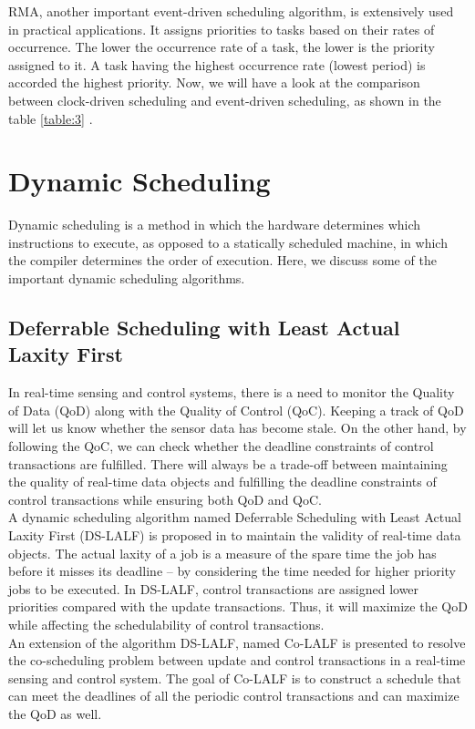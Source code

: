 \documentclass[12pt]{report}
\begin{document}
RMA, another important event-driven scheduling algorithm, is extensively used in practical applications. It assigns priorities to tasks based on their rates of occurrence. The lower the occurrence rate of a task, the lower is the priority assigned to it. A task having the highest occurrence rate (lowest period) is accorded the highest priority. Now, we will have a look at the comparison between clock-driven scheduling and event-driven scheduling, as shown in the table \ref{table:3} \cite{diff-clock-event}. 

\section{Dynamic Scheduling}
Dynamic scheduling is a method in which the hardware determines which instructions to execute, as opposed to a statically scheduled machine, in which the compiler determines the order of execution. Here, we discuss some of the important dynamic scheduling algorithms. 

\subsection{Deferrable Scheduling with Least Actual Laxity First}
In real-time sensing and control systems, there is a need to monitor the Quality of Data (QoD) along with the Quality of Control (QoC). Keeping a track of QoD will let us know whether the sensor data has become stale. On the other hand, by following the QoC, we can check whether the deadline constraints of control transactions are fulfilled. There will always be a trade-off between maintaining the quality of real-time data objects and fulfilling the deadline constraints of control transactions while ensuring both QoD and QoC.\\

A dynamic scheduling algorithm named Deferrable Scheduling with Least Actual Laxity First (DS-LALF) is proposed in \cite{ds-lalf} to maintain the validity of real-time data objects. The actual laxity of a job is a measure of the spare time the job has before it misses its deadline -- by considering the time needed for higher priority jobs to be executed. In DS-LALF, control transactions are assigned lower priorities compared with the update transactions. Thus, it will maximize the QoD while affecting the schedulability of control transactions. \\     

An extension of the algorithm DS-LALF, named Co-LALF is presented to resolve the co-scheduling problem between update and control transactions in a real-time sensing and control system. The goal of Co-LALF is to construct a schedule that can meet the deadlines of all the periodic control transactions and can maximize the QoD as well. 
\end{document}
